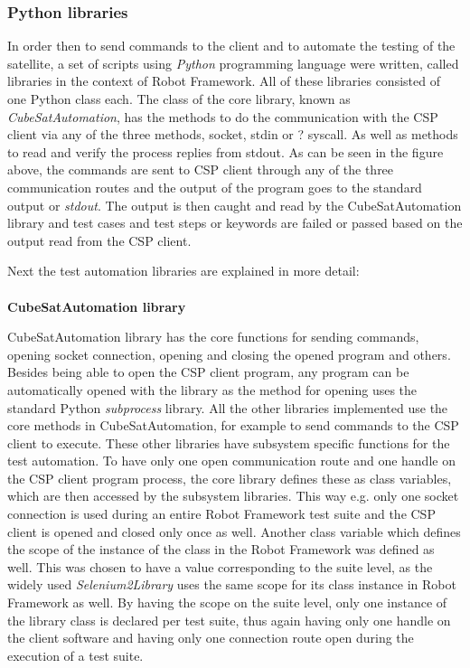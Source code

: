 \documentclass[english,12pt,a4paper,pdftex,elec,utf8]{aaltothesis}
\begin{document}
\subsubsection{Python libraries}
In order then to send commands to the client and to automate the testing of the satellite, a set of scripts using \textit{Python} programming language were written, called libraries in the context of Robot Framework. All of these libraries consisted of one Python class each. The class of the core library, known as \textit{CubeSatAutomation}, has the methods to do the communication with the CSP client via any of the three methods, socket, stdin or ? syscall. As well as methods to read and verify the process replies from stdout.
As can be seen in the figure above, the commands are sent to CSP client through any of the three communication routes and the output of the program goes to the standard output or \textit{stdout}. The output is then caught and read by the CubeSatAutomation library and test cases and test steps or keywords are failed or passed based on the output read from the CSP client. \par
Next the test automation libraries are explained in more detail: 
\\
\\
\textbf{CubeSatAutomation library}\par
CubeSatAutomation library has the core functions for sending commands, opening socket connection, opening and closing the opened program and others. Besides being able to open the CSP client program, any program can be automatically opened with the library as the method for opening uses the standard Python \textit{subprocess} library. All the other libraries implemented use the core methods in CubeSatAutomation, for example to send commands to the CSP client to execute. These other libraries have subsystem specific functions for the test automation. To have only one open communication route and one handle on the CSP client program process, the core library defines these as class variables, which are then accessed by the subsystem libraries. This way e.g. only one socket connection is used during an entire Robot Framework test suite and the CSP client is opened and closed only once as well. Another class variable which defines the scope of the instance of the class in the Robot Framework was defined as well. This was chosen to have a value corresponding to the suite level, as the widely used \textit{Selenium2Library} uses the same scope for its class instance in Robot Framework as well. By having the scope on the suite level, only one instance of the library class is declared per test suite, thus again having only one handle on the client software and having only one connection route open during the execution of a test suite.\par 
\end{document}
